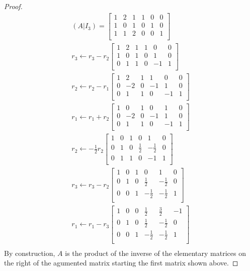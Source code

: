 \documentclass[11pt]{scrartcl}
\begin{document}
\begin{proof}
 \begin{align*}
	(A|I_3)=
	\left[\begin{array}{ccc|ccc}
	1 & 2 & 1 & 1 & 0 & 0 \\ 
	1 & 0 & 1 & 0 & 1 & 0 \\ 
	1 & 1 & 2 & 0 & 0 & 1 \\ 
	\end{array}\right]\\
	r_3 \leftarrow r_3 - r_2
	\left[\begin{array}{ccc|ccc}
	1 & 2 & 1 & 1 & 0 & 0 \\ 
	1 & 0 & 1 & 0 & 1 & 0 \\ 
	0 & 1 & 1 & 0 & -1 & 1 \\ 
	\end{array}\right]\\
	r_2 \leftarrow r_2 - r_1
	\left[\begin{array}{ccc|ccc}
	1 & 2  & 1 & 1  & 0  & 0 \\ 
	0 & -2 & 0 & -1 & 1  & 0 \\ 
	0 & 1  & 1 & 0  & -1 & 1 \\ 
	\end{array}\right]\\
	r_1 \leftarrow r_1 + r_2
	\left[\begin{array}{ccc|ccc}
	1 & 0  & 1 & 0  & 1  & 0 \\ 
	0 & -2 & 0 & -1 & 1  & 0 \\ 
	0 & 1  & 1 & 0  & -1 & 1 \\ 
	\end{array}\right]\\
	r_2 \leftarrow -\frac12r_2
	\left[\begin{array}{ccc|ccc}
	1 & 0 & 1 & 0  & 1  & 0 \\ 
	0 & 1 & 0 & \frac12 & -\frac12  & 0 \\ 
	0 & 1 & 1 & 0  & -1 & 1 \\ 
	\end{array}\right]\\
	r_3 \leftarrow r_3 - r_2
	\left[\begin{array}{ccc|ccc}
	1 & 0 & 1 & 0  & 1  & 0 \\ 
	0 & 1 & 0 & \frac12 & -\frac12 & 0 \\ 
	0 & 0 & 1 & -\frac12 & -\frac12 & 1 \\ 
	\end{array}\right]\\
	r_1 \leftarrow r_1 - r_3
	\left[\begin{array}{ccc|ccc}
	1 & 0 & 0 & \frac12 & \frac32  & -1 \\ 
	0 & 1 & 0 & \frac12 & -\frac12 & 0 \\ 
	0 & 0 & 1 & -\frac12 & -\frac12 & 1 \\ 
	\end{array}\right]\\
\end{align*}
By construction, $A$ is the product of the inverse of the elementary matrices on the right 
of the agumented matrix starting the first matrix shown above. 
\end{proof}
\end{document}
